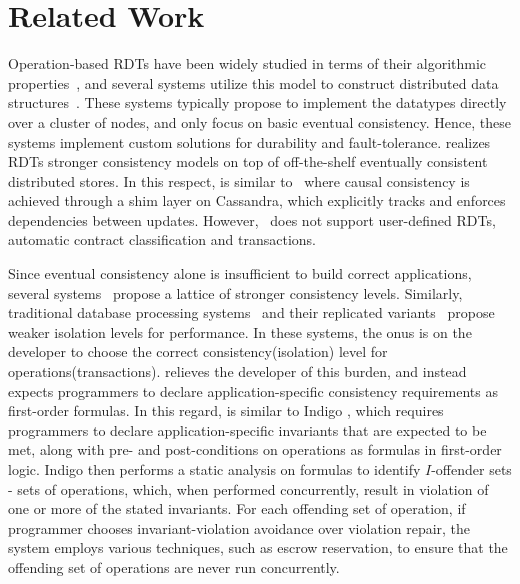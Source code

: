 \section{Related Work}
\label{sec:related}

Operation-based RDTs have been widely studied in terms of their algorithmic
properties~\cite{SSS,Burckhardt2014}, and several systems utilize this model to
construct distributed data structures~\cite{Cassandra,Bayou,Tango}. These
systems typically propose to implement the datatypes directly over a cluster of
nodes, and only focus on basic eventual consistency. Hence, these systems
implement custom solutions for durability and fault-tolerance. \name realizes
RDTs stronger consistency models on top of off-the-shelf eventually consistent
distributed stores. In this respect, \name is similar to~\cite{BoltOn} where
causal consistency is achieved through a shim layer on Cassandra, which
explicitly tracks and enforces dependencies between updates.
However,~\cite{BoltOn} does not support user-defined RDTs, automatic contract
classification and transactions.

Since eventual consistency alone is insufficient to build correct applications,
several systems~\cite{Bayou,Pileus,RedBlue} propose a lattice of stronger
consistency levels. Similarly, traditional database processing
systems~\cite{Berenson95} and their replicated variants~\cite{BailisHAT}
propose weaker isolation levels for performance. In these systems, the onus is
on the developer to choose the correct consistency(isolation) level for
operations(transactions). \name relieves the developer of this burden, and
instead expects programmers to declare application-specific consistency
requirements as first-order formulas. In this regard, \name is similar to Indigo
\cite{indigo}, which requires programmers to declare application-specific
invariants that are expected to be met, along with pre- and post-conditions on
operations as formulas in first-order logic. Indigo then performs a static
analysis on formulas to identify $I$-offender sets - sets of operations,
which, when performed concurrently, result in violation of one or more of the
stated invariants. For each offending set of operation, if programmer chooses
invariant-violation avoidance over violation repair, the system employs various
techniques, such as escrow reservation, to ensure that the offending set of
operations are never run concurrently.

